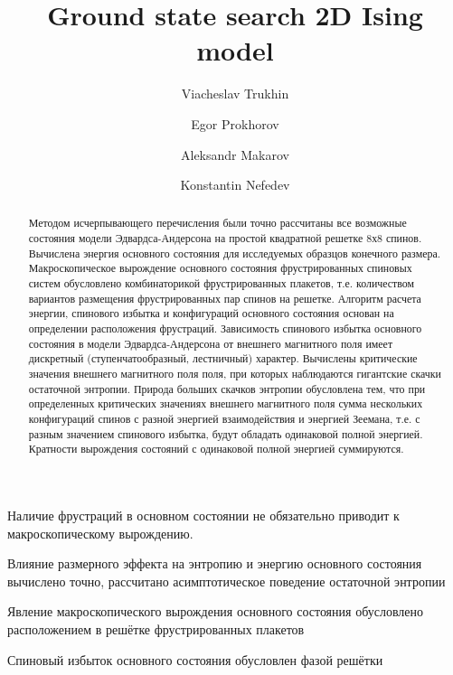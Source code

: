\documentclass[utf8, babel, sor, jor, amsmath, amssymb, reprint]{elsarticle} %
\begin{document}
\begin{frontmatter}


\title{Ground state search 2D Ising model}

\author[mainaddress, secondaryaddress]{Viacheslav Trukhin}

\author[mainaddress]{Egor Prokhorov}

\author[mainaddress, secondaryaddress]{Aleksandr Makarov}

\author[mainaddress, secondaryaddress]{Konstantin Nefedev}


\address[mainaddress]{Far Eastern Federal University, Vladivostok, Russky Island, 10 Ajax Bay, 690922, the Russian Federation}
\address[secondaryaddress]{Institute of Applied Mathematics, Far Eastern Branch, Russian Academy of Science, Vladivostok, Radio 7, 690041, the Russian Federation}

\begin{abstract}

Методом исчерпывающего перечисления были точно рассчитаны все возможные состояния модели Эдвардса-Андерсона на простой квадратной решетке 8х8 спинов. Вычислена энергия основного состояния для исследуемых образцов конечного размера. Макроскопическое вырождение основного состояния фрустрированных спиновых систем обусловлено комбинаторикой фрустрированных плакетов, т.е. количеством вариантов размещения фрустрированных пар спинов на решетке. Алгоритм расчета энергии, спинового избытка и конфигураций основного состояния основан на определении расположения фрустраций. Зависимость спинового избытка основного состояния в модели Эдвардса-Андерсона от внешнего магнитного поля имеет дискретный (ступенчатообразный, лестничный) характер. Вычислены критические значения внешнего магнитного поля поля, при которых наблюдаются гигантские скачки остаточной энтропии. Природа больших скачков энтропии обусловлена тем, что при определенных критических значениях внешнего магнитного поля сумма нескольких конфигураций спинов с разной энергией взаимодействия и энергией Зеемана, т.е. с разным значением спинового избытка, будут обладать одинаковой полной энергией. Кратности вырождения состояний с одинаковой полной энергией суммируются.  

\end{abstract}


\begin{highlights}
	\item Наличие фрустраций в основном состоянии не обязательно приводит к макроскопическому вырождению.
	\item Влияние размерного эффекта на энтропию и энергию основного состояния вычислено точно, рассчитано асимптотическое поведение остаточной энтропии
	\item Явление макроскопического вырождения основного состояния обусловлено расположением в решётке фрустрированных плакетов
	\item Спиновый избыток основного состояния обусловлен фазой решётки
\end{highlights}



\end{frontmatter}
\end{document}
